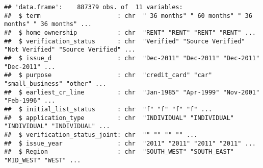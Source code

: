 \documentclass[]{article}
\newenvironment{Shaded}{\begin{snugshade}}{\end{snugshade}}
\newcommand{\KeywordTok}[1]{\textcolor[rgb]{0.13,0.29,0.53}{\textbf{#1}}}
\newcommand{\StringTok}[1]{\textcolor[rgb]{0.31,0.60,0.02}{#1}}
\newcommand{\OperatorTok}[1]{\textcolor[rgb]{0.81,0.36,0.00}{\textbf{#1}}}
\newcommand{\NormalTok}[1]{#1}
\begin{document}
\begin{verbatim}
## 'data.frame':    887379 obs. of  11 variables:
##  $ term                     : chr  " 36 months" " 60 months" " 36 months" " 36 months" ...
##  $ home_ownership           : chr  "RENT" "RENT" "RENT" "RENT" ...
##  $ verification_status      : chr  "Verified" "Source Verified" "Not Verified" "Source Verified" ...
##  $ issue_d                  : chr  "Dec-2011" "Dec-2011" "Dec-2011" "Dec-2011" ...
##  $ purpose                  : chr  "credit_card" "car" "small_business" "other" ...
##  $ earliest_cr_line         : chr  "Jan-1985" "Apr-1999" "Nov-2001" "Feb-1996" ...
##  $ initial_list_status      : chr  "f" "f" "f" "f" ...
##  $ application_type         : chr  "INDIVIDUAL" "INDIVIDUAL" "INDIVIDUAL" "INDIVIDUAL" ...
##  $ verification_status_joint: chr  "" "" "" "" ...
##  $ issue_year               : chr  "2011" "2011" "2011" "2011" ...
##  $ Region                   : chr  "SOUTH_WEST" "SOUTH_EAST" "MID_WEST" "WEST" ...
\end{verbatim}

\begin{Shaded}
\end{Shaded}
\end{document}
